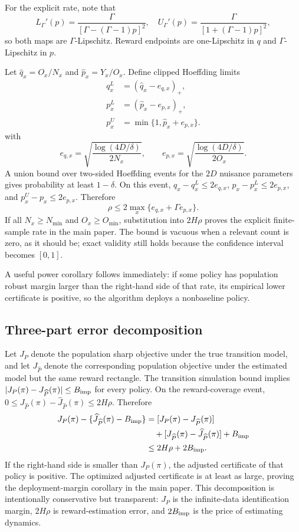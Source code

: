 \documentclass[letterpaper]{article}
\begin{document}
For the explicit rate, note that
\[
L_\Gamma'(p)=\frac{\Gamma}{[\Gamma-(\Gamma-1)p]^2},
\quad
U_\Gamma'(p)=\frac{\Gamma}{[1+(\Gamma-1)p]^2},
\]
so both maps are $\Gamma$-Lipschitz. Reward endpoints are one-Lipschitz in $q$ and $\Gamma$-Lipschitz in $p$.

Let $\widehat q_x=O_x/N_x$ and $\widehat p_x=Y_x/O_x$. Define clipped Hoeffding limits
\begin{align*}
q_x^L&=(\widehat q_x-e_{q,x})_+,\\
p_x^L&=(\widehat p_x-e_{p,x})_+,\\
p_x^U&=\min\{1,\widehat p_x+e_{p,x}\}.
\end{align*}
with
\[
e_{q,x}=\sqrt{\frac{\log(4D/\delta)}{2N_x}},
\qquad
e_{p,x}=\sqrt{\frac{\log(4D/\delta)}{2O_x}}.
\]
A union bound over two-sided Hoeffding events for the $2D$ nuisance parameters gives probability at least $1-\delta$. On this event,
$q_x-q_x^L\leq2e_{q,x}$,
$p_x-p_x^L\leq2e_{p,x}$, and
$p_x^U-p_x\leq2e_{p,x}$. Therefore
\[
\rho\leq2\max_x\{e_{q,x}+\Gamma e_{p,x}\}.
\]
If all $N_x\geq N_{\min}$ and $O_x\geq O_{\min}$, substitution into $2H\rho$ proves the explicit finite-sample rate in the main paper. The bound is vacuous when a relevant count is zero, as it should be; exact validity still holds because the confidence interval becomes $[0,1]$.

A useful power corollary follows immediately: if some policy has population robust margin larger than the right-hand side of that rate, its empirical lower certificate is positive, so the algorithm deploys a nonbaseline policy.


\subsection{Three-part error decomposition}
Let $J_{P}$ denote the population sharp objective under the true transition model, and let $J_{\widehat P}$ denote the corresponding population objective under the estimated model but the same reward rectangle. The transition simulation bound implies
$|J_P(\pi)-J_{\widehat P}(\pi)|\leq B_{\rm imp}$ for every policy. On the reward-coverage event,
$0\leq J_{\widehat P}(\pi)-\widehat J_{\widehat P}(\pi)\leq2H\rho$.
Therefore
\begin{align*}
J_P(\pi)-\{\widehat J_{\widehat P}(\pi)-B_{\rm imp}\}
&=[J_P(\pi)-J_{\widehat P}(\pi)]\\
&\quad+[J_{\widehat P}(\pi)-\widehat J_{\widehat P}(\pi)]
+B_{\rm imp}\\
&\leq2H\rho+2B_{\rm imp}.
\end{align*}
If the right-hand side is smaller than $J_P(\pi)$, the adjusted certificate of that policy is positive. The optimized adjusted certificate is at least as large, proving the deployment-margin corollary in the main paper. This decomposition is intentionally conservative but transparent: $J_P$ is the infinite-data identification margin, $2H\rho$ is reward-estimation error, and $2B_{\rm imp}$ is the price of estimating dynamics.
\end{document}
